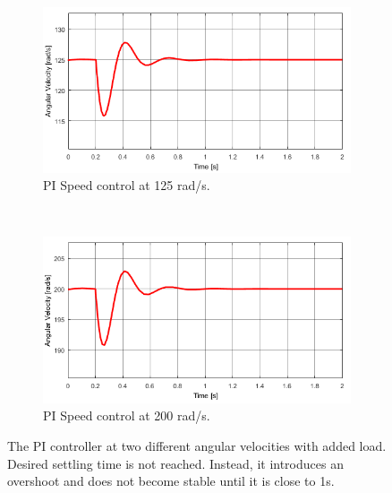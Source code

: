 \begin{figure}[h!]
	\centering
	\begin{subfigure}[b]{0.45\textwidth}
		\includegraphics[width=\textwidth]{graphics/PI_load125}
		\caption{PI Speed control at 125 rad/s.}
		\label{fig:piload125}
	\end{subfigure}
	~ %
	\begin{subfigure}[b]{0.45\textwidth}
		\includegraphics[width=\textwidth]{graphics/PI_load200}
		\caption{PI Speed control at 200 rad/s.}
		\label{fig:piload200}
	\end{subfigure}
	\caption{The PI controller at two different angular velocities with added load. Desired settling time is not reached. Instead, it introduces an overshoot and does not become stable until it is close to 1s.}
	\label{fig:piload}
\end{figure}

